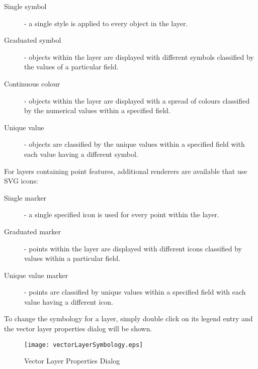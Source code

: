 \begin{description}
    \item[Single symbol] - a single style is applied to every
    object in the layer.
    \item[Graduated symbol] - objects within the layer are
    displayed with different symbols classified by the values of a
    particular field.
    \item[Continuous colour] - objects within the layer are
    displayed with a spread of colours classified by the numerical
    values within a specified field.
    \item[Unique value] - objects are classified by the unique
    values within a specified field with each value having a
    different symbol.
\end{description}

For layers containing point features, additional renderers are
available that use SVG icons:

\begin{description}
    \item[Single marker] - a single specified icon is used for
    every point within the layer.
    \item[Graduated marker] - points within the layer are
    displayed with different icons classified by values within a
    particular field.
    \item[Unique value marker] - points are classified by unique
    values within a specified field with each value having a
    different icon.
\end{description}

To change the symbology for a layer, simply double click on its legend entry
and
the vector layer properties dialog will be shown.

\begin{figure}[ht]
   \begin{center}
   \caption{Vector Layer Properties
Dialog}\label{fig:vector_symbology}\smallskip
   \texttt{[image: vectorLayerSymbology.eps]} 
\end{center}  
\end{figure}

